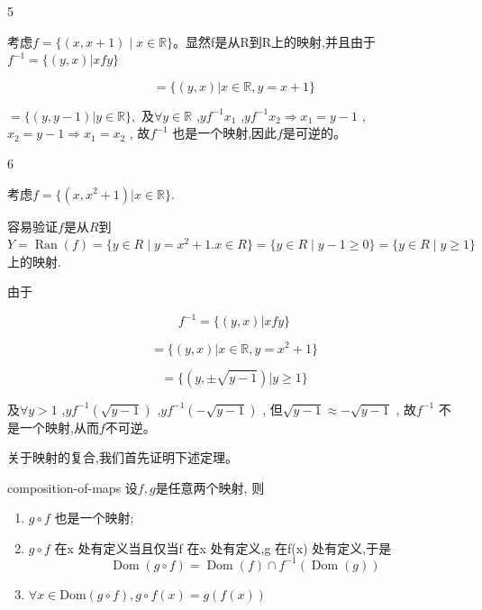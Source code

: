 \begin{sourceexample}{5}

考虑\(f = \{(x, x+1) \mid x \in \mathbb{R}\}\)。显然f是从R到R上的映射,并且由于\(f^{-1} = \{(y, x) | xfy\}\)

\[= \{(y, x) | x \in \mathbb{R}, y = x + 1\}\]

\(= \{(y, y - 1) | y \in \mathbb{R}\},\) 及\(\forall y \in \mathbb{R}\) ,\(yf^{-1}x_1\) ,\(yf^{-1}x_2 \Longrightarrow x_1 = y - 1\) ,\(x_2 = y - 1 \Longrightarrow x_1 = x_2\) , 故\(f^{-1}\) 也是一个映射,因此$f$是可逆的。

\end{sourceexample}



\begin{sourceexample}{6}

考虑\(f = \{(x, x^2 + 1) | x \in \mathbb{R}\}.\)

容易验证$f$是从$R$到\(Y = \operatorname{Ran}(f) = \{y \in R \mid y = x^2 + 1. x \in R\} = \{y \in R \mid y - 1 \ge 0\} = \{y \in R \mid y \ge 1\}\) 上的映射.

由于

\[f^{-1} = \{ (y, x) | xfy \}\]

\[= \{ (y, x) | x \in \mathbb{R}, y = x^2 + 1 \}\]

\[= \{ (y, \pm \sqrt{y-1}) | y \ge 1 \}\]

及\(\forall y > 1\) ,\(yf^{-1}(\sqrt{y-1})\) ,\(yf^{-1}(-\sqrt{y-1})\) , 但\(\sqrt{y-1} \approx -\sqrt{y-1}\) , 故\(f^{-1}\) 不是一个映射,从而$f$不可逆。

\end{sourceexample}



关于映射的复合,我们首先证明下述定理。

\begin{mythm}{}{composition-of-maps}
	设$f,g$是任意两个映射, 则
	\begin{enumerate}[label=\arabic*)]
		\item \(g \circ f\) 也是一个映射;
		\item \(g \circ f\) 在x 处有定义当且仅当f 在x 处有定义,g 在f(x) 处有定义,于是
		\[
			\operatorname{Dom}(g \circ f) = \operatorname{Dom}(f) \cap f^{-1}(\operatorname{Dom}(g))
		\]
		\item \(\forall x \in \text{Dom}(g \circ f), g \circ f(x) = g(f(x))\)
	\end{enumerate}
\end{mythm}




